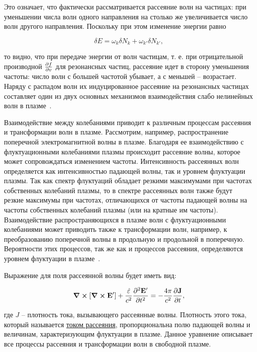 \documentclass[10pt, a4paper]{article}
\begin{document}
Это означает, что фактически рассматривается рассеяние волн на частицах: при уменьшении числа волн одного направления на столько же увеличивается число волн другого направления. Поскольку при этом изменение энергии равно

\begin{equation*}
	\delta E = \omega_k\delta N_k + \omega_{k'}\delta N_{k'},
\end{equation*} 

то видно, что при передаче энергии от волн частицам, т. е. при отрицательной производной $\pdv{f}{v}$ для резонансных частиц, рассеяние идет в сторону уменьшения частоты: число волн с большей частотой убывает, а с меньшей -- возрастает. Наряду с распадом волн их индуцированное рассеяние на резонансных частицах составляет один из двух основных механизмов взаимодействия слабо нелинейных волн в плазме~\cite{kadomtsev}.

Взаимодействие между колебаниями приводит к различным процессам рассеяния и трансформации волн в плазме. Рассмотрим, например, распространение поперечной электромагнитной волны в плазме. Благодаря ее взаимодействию с флуктуационными колебаниями плазмы происходит рассеяние волны, которое может сопровождаться изменением частоты. Интенсивность рассеянных волн определяется как интенсивностью падающей волны, так и уровнем флуктуации плазмы. Так как спектр флуктуаций обладает резкими максимумами при частотах собственных колебаний плазмы, то в спектре рассеянных волн также будут резкие максимумы при частотах, отличающихся от частоты падающей волны на частоты собственных колебаний плазмы (или на кратные им частоты). Взаимодействие распространяющихся в плазме волн с флуктуационными колебаниями может приводить также к трансформации волн, например, к преобразованию поперечной волны в продольную и продольной в поперечную. Вероятности этих процессов, так же как и процессов рассеяния, определяются уровнем флуктуации в плазме~\cite{akhiezer}.

Выражение для поля рассеянной волны будет иметь вид:

\begin{equation*}
	\curl{[\curl{\vb{E}'}]}+\frac{\hat{\varepsilon}}{c^2}\pdv[2]{\vb{E}'}{t} = -\frac{4\pi}{c^2}\pdv{\vb{J}}{t},
\end{equation*}

где $J$ -- плотность
тока, вызывающего рассеянные волны. Плотность этого тока, который называется \uline{током рассеяния}, пропорциональна
полю падающей волны и величинам, характеризующим флуктуации в плазме.
Данное уравнение описывает все процессы рассеяния и
трансформации волн в свободной плазме.
\end{document}
